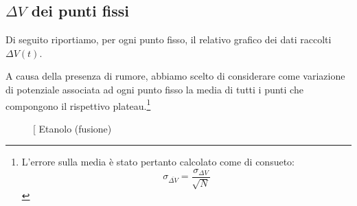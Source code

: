 \documentclass{article}
\begin{document}
\subsection{$\Delta V$ dei punti fissi}
Di seguito riportiamo, per ogni punto fisso, il relativo
grafico dei dati raccolti $\Delta V(t)$.

A causa della presenza di rumore, abbiamo scelto di
considerare come variazione di potenziale associata
ad ogni punto fisso la media di tutti i punti che
compongono il rispettivo plateau.\footnote{
  L'errore sulla media è stato pertanto calcolato
  come di consueto:
  \[
    \sigma_{\overline{\Delta V}} =
    \frac{\sigma_{\Delta V}}{\sqrt{N}}
  \]
}

\begin{figure}[H]
  \centering
  \hfil
  \hfil
  \hfil
  \subfloat[][
    Etanolo (fusione)


\end{figure}
\end{document}
